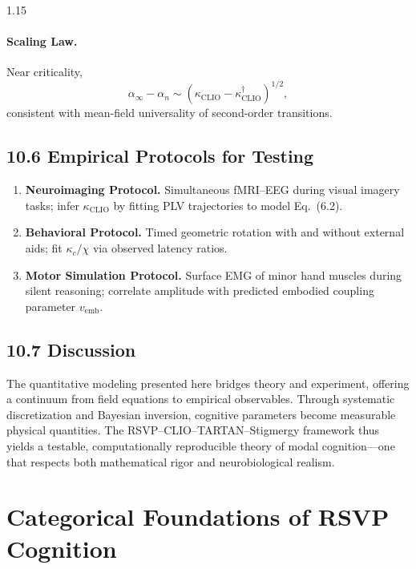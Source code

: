 \documentclass[12pt,a4paper]{article}
\begin{document}
\begin{spacing}{1.15}
\paragraph{Scaling Law.}
Near criticality,
\[
\alpha_\infty-\alpha_n \sim
  (\kappa_{\mathrm{CLIO}}-\kappa_{\mathrm{CLIO}}^\dagger)^{1/2},
\]
consistent with mean-field universality of second-order transitions.

\subsection{10.6 Empirical Protocols for Testing}

\begin{enumerate}[label=(\roman*),leftmargin=1.2em]
\item \textbf{Neuroimaging Protocol.}  
Simultaneous fMRI–EEG during visual imagery tasks; infer $\kappa_{\mathrm{CLIO}}$ by fitting PLV trajectories to model Eq.\ (6.2).
\item \textbf{Behavioral Protocol.}  
Timed geometric rotation with and without external aids; fit $\kappa_c/\chi$ via observed latency ratios.
\item \textbf{Motor Simulation Protocol.}  
Surface EMG of minor hand muscles during silent reasoning; correlate amplitude with predicted embodied coupling parameter $v_{\mathrm{emb}}$.
\end{enumerate}

\subsection{10.7 Discussion}

The quantitative modeling presented here bridges theory and experiment, offering a continuum from field equations to empirical observables.  
Through systematic discretization and Bayesian inversion, cognitive parameters become measurable physical quantities.  
The RSVP–CLIO–TARTAN–Stigmergy framework thus yields a testable, computationally reproducible theory of modal cognition—one that respects both mathematical rigor and neurobiological realism.

\section{Categorical Foundations of RSVP Cognition}
\label{sec:categorical}

\usepackage{tikz-cd}


\end{spacing}
\end{document}
